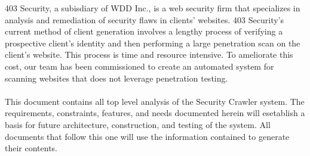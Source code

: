 403 Security, a subisdiary of WDD Inc., is a web security firm that specializes in analysis and remediation of security flaws in clients' websites.  403 Security's current method of client generation involves a lengthy process of verifying a prospective client's identity and then performing a large penetration scan on the client's website.  This process is time and resource intensive.  To ameliorate this cost, our team has been commissioned to create an automated system for scanning websites that does not leverage penetration testing.\\\\
This document contains all top level analysis of the Security Crawler system.  The requirements, constraints, features, and needs documented herein will esetablish a basis for future architecture, construction, and testing of the system.  All documents that follow this one will use the information contained to generate their contents.
